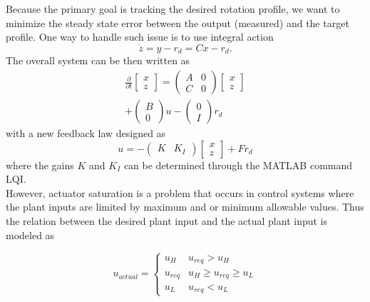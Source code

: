 \documentclass{iopart}
\begin{document}
Because the primary goal is tracking the desired rotation profile, we want to minimize the steady state error between the output (measured) and the target profile. One way to handle such issue is to use integral action
\begin{equation}
	\dot{z} = y - r_{d} = C x - r_{d}.
	\label{integral}
\end{equation}
The overall system can be then written as
\begin{multline}
\frac{\partial}{\partial t}   \left[\! \begin{array}{c}  x \\ z \end{array}\!\right]
  ={ \left(\! \begin{array}{cc} A  & 0 \\ C & 0 \end{array} \! \right)} \left[\! \begin{array}{c} x \\ z    \end{array}  \!\right] \\
  + \left(\! \begin{array}{c} B   \\ 0    \end{array}  \!\right) u -  \left(\! \begin{array}{c}  0 \\ I \end{array}\!\right) r_{d}
\label{int2}
\end{multline}
with a new feedback law designed as
\begin{equation}
u =   - \left(\! \begin{array}{cc}  K & K_I\end{array}\!\right) \left[\! \begin{array}{c}  x \\ z \end{array}\!\right] + F r_{d}
\end{equation}
where the gains $K$ and $K_I$ can be determined through the MATLAB command LQI.\\

However, actuator saturation is a problem that occurs in control systems where the plant inputs are limited by maximum and or minimum allowable values. Thus the relation between the desired plant input and the actual plant input is modeled as

\[
    u_{actual} = 
\begin{cases}
    u_{H} & u_{req} > u_{H} \\
    u_{req} &  u_{H} \ge u_{req} \ge u_{L} \\
    u_{L}              & u_{req} < u_{L}
\end{cases}
\]
\end{document}

